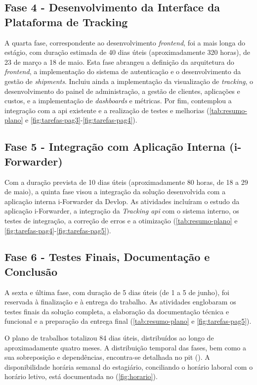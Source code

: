 \subsection{Fase 4 - Desenvolvimento da Interface da Plataforma de Tracking}

A quarta fase, correspondente ao desenvolvimento \textit{frontend}, foi a mais longa do estágio, com duração estimada de 40 dias úteis (aproximadamente 320 horas), de 23 de março a 18 de maio. Esta fase abrangeu a definição da arquitetura do \textit{frontend}, a implementação do sistema de autenticação e o desenvolvimento da gestão de \textit{shipments}. Incluiu ainda a implementação da visualização de \textit{tracking}, o desenvolvimento do painel de administração, a gestão de clientes, aplicações e custos, e a implementação de \textit{dashboards} e métricas. Por fim, contemplou a integração com a \gls{api} existente e a realização de testes e melhorias (\autoref{tab:resumo-plano} e \autoref{fig:tarefas-pag3}-\autoref{fig:tarefas-pag4}).

\subsection{Fase 5 - Integração com Aplicação Interna (i-Forwarder)}

Com a duração prevista de 10 dias úteis (aproximadamente 80 horas, de 18 a 29 de maio), a quinta fase visou a integração da solução desenvolvida com a aplicação interna i-Forwarder da Devlop. As atividades incluíram o estudo da aplicação i-Forwarder, a integração da \textit{Tracking \gls{api}} com o sistema interno, os testes de integração, a correção de erros e a otimização (\autoref{tab:resumo-plano} e \autoref{fig:tarefas-pag4}-\autoref{fig:tarefas-pag5}).

\subsection{Fase 6 - Testes Finais, Documentação e Conclusão}

A sexta e última fase, com duração de 5 dias úteis (de 1 a 5 de junho), foi reservada à finalização e à entrega do trabalho. As atividades englobaram os testes finais da solução completa, a elaboração da documentação técnica e funcional e a preparação da entrega final (\autoref{tab:resumo-plano} e \autoref{fig:tarefas-pag5}).

O plano de trabalhos totalizou 84 dias úteis, distribuídos ao longo de aproximadamente quatro meses. A distribuição temporal das fases, bem como a sua sobreposição e dependências, encontra-se detalhada no \gls{pit} (). A disponibilidade horária semanal do estagiário, conciliando o horário laboral com o horário letivo, está documentada no  (\autoref{fig:horario}).

